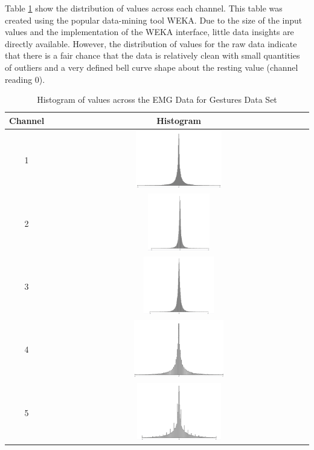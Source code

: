 \documentclass[11pt]{article}
\begin{document}
	\noindent
	Table \ref{tbl:histo} show the distribution of values across each channel. This table was created using the popular data-mining tool WEKA. Due to the size of the input values and the implementation of the WEKA interface, little data insights are directly available. However, the distribution of values for the raw data indicate that there is a fair chance that the data is relatively clean with small quantities of outliers and a very defined bell curve shape about the resting value (channel reading 0). 

	\begin{table}[H]
		\centering		
		\caption{Histogram of values across the EMG Data for Gestures Data Set}
		\label{tbl:histo}
		\begin{tabular}{cc}
			\toprule
			Channel & Histogram\\
			\midrule
			1 & \includegraphics[height=2.5cm, width=12cm]{Figures/Stats/channel1}\\
			2 & \includegraphics[height=2.5cm, width=12cm]{Figures/Stats/channel2}\\
			3 & \includegraphics[height=2.5cm, width=12cm]{Figures/Stats/channel3}\\
			4 & \includegraphics[height=2.5cm, width=12cm]{Figures/Stats/channel4}\\
			5 & \includegraphics[height=2.5cm, width=12cm]{Figures/Stats/channel5}\\

\end{tabular}
\end{table}
\end{document}
